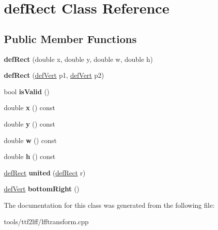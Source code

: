\hypertarget{classdefRect}{\section{def\-Rect Class Reference}
\label{classdefRect}
}
\subsection*{Public Member Functions}
\begin{DoxyCompactItemize}
\item 
\hypertarget{classdefRect_a3fdf57f86ce3bc244dcf41607407637c}{{\bfseries def\-Rect} (double x, double y, double w, double h)}\label{classdefRect_a3fdf57f86ce3bc244dcf41607407637c}

\item 
\hypertarget{classdefRect_ad179e8725e2c57978f032734324db829}{{\bfseries def\-Rect} (\hyperlink{classdefVert}{def\-Vert} p1, \hyperlink{classdefVert}{def\-Vert} p2)}\label{classdefRect_ad179e8725e2c57978f032734324db829}

\item 
\hypertarget{classdefRect_afe65d59aeac668e2d5ff6492a19da0e9}{bool {\bfseries is\-Valid} ()}\label{classdefRect_afe65d59aeac668e2d5ff6492a19da0e9}

\item 
\hypertarget{classdefRect_ab6bef6554aa395a7b4ebe491a2cd7d08}{double {\bfseries x} () const }\label{classdefRect_ab6bef6554aa395a7b4ebe491a2cd7d08}

\item 
\hypertarget{classdefRect_aa0fb735a014db0c92a24113bb2e05440}{double {\bfseries y} () const }\label{classdefRect_aa0fb735a014db0c92a24113bb2e05440}

\item 
\hypertarget{classdefRect_a6f5da31c4a242c148bc8f1856cd51446}{double {\bfseries w} () const }\label{classdefRect_a6f5da31c4a242c148bc8f1856cd51446}

\item 
\hypertarget{classdefRect_adf27f4e0fb0dcd9ebd3ceb6837c53459}{double {\bfseries h} () const }\label{classdefRect_adf27f4e0fb0dcd9ebd3ceb6837c53459}

\item 
\hypertarget{classdefRect_afbd5261f7499f9ce63b957994640b8e1}{\hyperlink{classdefRect}{def\-Rect} {\bfseries united} (\hyperlink{classdefRect}{def\-Rect} r)}\label{classdefRect_afbd5261f7499f9ce63b957994640b8e1}

\item 
\hypertarget{classdefRect_aca3caafd65d4233528ebd51003d96121}{\hyperlink{classdefVert}{def\-Vert} {\bfseries bottom\-Right} ()}\label{classdefRect_aca3caafd65d4233528ebd51003d96121}

\end{DoxyCompactItemize}


The documentation for this class was generated from the following file\-:\begin{DoxyCompactItemize}
\item 
tools/ttf2lff/lfftransform.\-cpp\end{DoxyCompactItemize}
